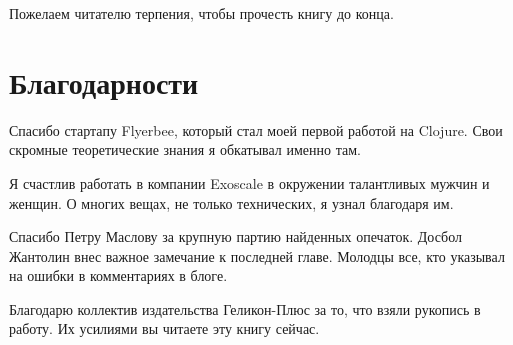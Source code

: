 Пожелаем читателю терпения, чтобы прочесть книгу до конца.

\section*{Благодарности}

Спасибо стартапу Flyerbee, который стал моей первой работой на Clojure. Свои
скромные теоретические знания я обкатывал именно там.

Я счастлив работать в компании Exoscale в окружении талантливых мужчин и
женщин. О многих вещах, не только технических, я узнал благодаря им.

Спасибо Петру Маслову за крупную партию найденных опечаток. Досбол Жантолин внес
важное замечание к последней главе. Молодцы все, кто указывал на ошибки в
комментариях в блоге.

Благодарю коллектив издательства Геликон-Плюс за то, что взяли рукопись в
работу. Их усилиями вы читаете эту книгу сейчас.

